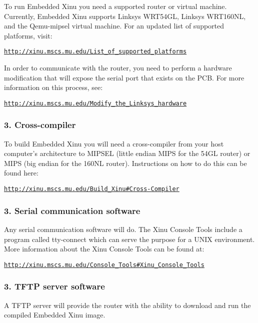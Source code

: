To run Embedded Xinu you need a supported router or virtual machine. Currently, Embedded Xinu supports Linksys W\-R\-T54\-G\-L, Linksys W\-R\-T160\-N\-L, and the Qemu-\/mipsel virtual machine. For an updated list of supported platforms, visit\-:

\href{http://xinu.mscs.mu.edu/List_of_supported_platforms}{\tt http\-://xinu.\-mscs.\-mu.\-edu/\-List\-\_\-of\-\_\-supported\-\_\-platforms}

In order to communicate with the router, you need to perform a hardware modification that will expose the serial port that exists on the P\-C\-B. For more information on this process, see\-:

\href{http://xinu.mscs.mu.edu/Modify_the_Linksys_hardware}{\tt http\-://xinu.\-mscs.\-mu.\-edu/\-Modify\-\_\-the\-\_\-\-Linksys\-\_\-hardware}

\subsubsection*{3. Cross-\/compiler}

To build Embedded Xinu you will need a cross-\/compiler from your host computer's architecture to M\-I\-P\-S\-E\-L (little endian M\-I\-P\-S for the 54\-G\-L router) or M\-I\-P\-S (big endian for the 160\-N\-L router). Instructions on how to do this can be found here\-:

\href{http://xinu.mscs.mu.edu/Build_Xinu#Cross-Compiler}{\tt http\-://xinu.\-mscs.\-mu.\-edu/\-Build\-\_\-\-Xinu\#\-Cross-\/\-Compiler}

\subsubsection*{3. Serial communication software}

Any serial communication software will do. The Xinu Console Tools include a program called tty-\/connect which can serve the purpose for a U\-N\-I\-X environment. More information about the Xinu Console Tools can be found at\-:

\href{http://xinu.mscs.mu.edu/Console_Tools#Xinu_Console_Tools}{\tt http\-://xinu.\-mscs.\-mu.\-edu/\-Console\-\_\-\-Tools\#\-Xinu\-\_\-\-Console\-\_\-\-Tools}

\subsubsection*{3. T\-F\-T\-P server software}

A T\-F\-T\-P server will provide the router with the ability to download and run the compiled Embedded Xinu image.


